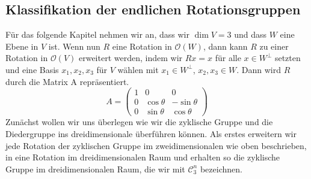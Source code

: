 \subsection{Klassifikation der endlichen Rotationsgruppen}
Für das folgende Kapitel nehmen wir an, dass wir $\dim V = 3$ und dass $W$ eine Ebene in $V$ ist. Wenn nun $R$ eine Rotation in $\mathcal{O}(W)$, dann kann $R$ zu einer Rotation in $\mathcal{O}(V)$ erweitert werden, indem wir $Rx=x$ für alle $x \in W^\perp$ setzten und eine Basis ${x_1,x_2,x_3}$ für $V$ wählen mit $x_1 \in W^\perp$, $x_2, x_3 \in W$. Dann wird $R$ durch die Matrix A repräsentiert.
$$A=\begin{pmatrix}
1 & 0 & 0 \\
0 & \cos{\theta} & -\sin{\theta} \\
0 & \sin{\theta} & \cos{\theta}
\end{pmatrix} $$ 
Zunächst wollen wir uns überlegen wie wir die zyklische Gruppe und die Diedergruppe ins dreidimensionale überführen können. Als erstes erweitern wir jede Rotation der zyklischen Gruppe im zweidimensionalen wie oben beschrieben, in eine Rotation im dreidimensionalen Raum und erhalten so die zyklische Gruppe im dreidimensionalen Raum, die wir mit $\mathcal{C}_3^n$ bezeichnen. 

